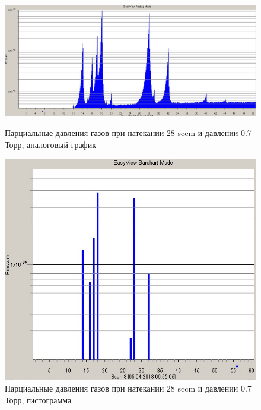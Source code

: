 \documentclass[a4paper]{article}
\begin{document}
\begin{figure}[h]
\begin{center}
\begin{minipage}[h]{0.5\linewidth}
\includegraphics[width=1\linewidth]{flow28analog.jpg}
\caption{Парциальные давления газов при натекании 28 sccm и давлении 0.7 Торр, аналоговый график  } %
\end{minipage}
\hfill 
\begin{minipage}[h]{0.4\linewidth}
\includegraphics[width=1\linewidth]{flow28gisto.jpg}
\caption{Парциальные давления газов при натекании 28 sccm и давлении 0.7 Торр, гистограмма  }
\label{ris:experimcoded}
\end{minipage}
\end{center}
\end{figure}
\end{document}
